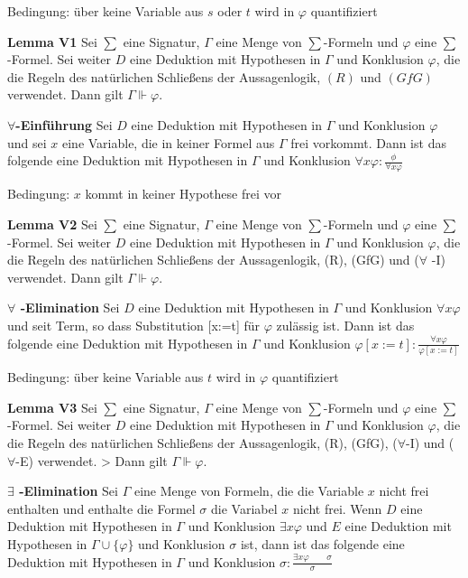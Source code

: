 \documentclass[a4paper]{article}
\renewcommand{\note}[2]{\begin{noteBox} \textbf{#1} #2 \end{noteBox}}
\begin{document}
\begin{multicols}{3}
  Bedingung: über keine Variable aus $s$ oder $t$ wird in $\varphi$ quantifiziert

  \note{Lemma V1}{Sei $\sum$ eine Signatur, $\Gamma$ eine Menge von $\sum$-Formeln und $\varphi$ eine $\sum$-Formel. Sei weiter $D$ eine Deduktion mit Hypothesen in $\Gamma$ und Konklusion $\varphi$, die die Regeln des natürlichen Schließens der Aussagenlogik, $(R)$ und $(GfG)$ verwendet. Dann gilt $\Gamma\Vdash\varphi$.}

  \note{$\forall$-Einführung}{ Sei $D$ eine Deduktion mit Hypothesen in $\Gamma$ und Konklusion $\varphi$ und sei $x$ eine Variable, die in keiner Formel aus $\Gamma$ frei vorkommt. Dann ist das folgende eine Deduktion mit Hypothesen in $\Gamma$ und Konklusion $\forall x\varphi: \frac{\phi}{\forall x\varphi}$

    Bedingung: $x$ kommt in keiner Hypothese frei vor}

  \note{Lemma V2}{Sei $\sum$ eine Signatur, $\Gamma$ eine Menge von $\sum$-Formeln und $\varphi$ eine $\sum$-Formel. Sei weiter $D$ eine Deduktion mit Hypothesen in $\Gamma$ und Konklusion $\varphi$, die die Regeln des natürlichen Schließens der Aussagenlogik, (R), (GfG) und ($\forall$ -I) verwendet. Dann gilt $\Gamma\Vdash\varphi$.}

  \note{$\forall$ -Elimination}{Sei $D$ eine Deduktion mit Hypothesen in $\Gamma$ und Konklusion $\forall x\varphi$ und seit Term, so dass Substitution [x:=t] für $\varphi$ zulässig ist. Dann ist das folgende eine Deduktion mit Hypothesen in $\Gamma$ und Konklusion $\varphi[x:=t]:\frac{\forall x\varphi}{\varphi[x:=t]}$

    Bedingung: über keine Variable aus $t$ wird in $\varphi$ quantifiziert}

  \note{Lemma V3}{ Sei $\sum$ eine Signatur, $\Gamma$ eine Menge von $\sum$-Formeln und $\varphi$ eine $\sum$-Formel. Sei weiter $D$ eine Deduktion mit Hypothesen in $\Gamma$ und Konklusion $\varphi$, die die Regeln des natürlichen Schließens der Aussagenlogik, (R), (GfG), ($\forall$-I) und ($\forall$-E) verwendet. > Dann gilt $\Gamma\Vdash\varphi$.}

  \note{$\exists$ -Elimination}{Sei $\Gamma$ eine Menge von Formeln, die die Variable $x$ nicht frei enthalten und enthalte die Formel $\sigma$  die Variabel $x$ nicht frei. Wenn $D$ eine Deduktion mit Hypothesen in $\Gamma$ und Konklusion $\exists x\varphi$ und $E$ eine Deduktion mit Hypothesen in $\Gamma\cup\{\varphi\}$ und Konklusion $\sigma$ ist, dann ist das folgende eine Deduktion mit Hypothesen in $\Gamma$ und Konklusion $\sigma:\frac{\exists x\varphi \quad\quad \sigma}{\sigma}$

}
\end{multicols}
\end{document}
